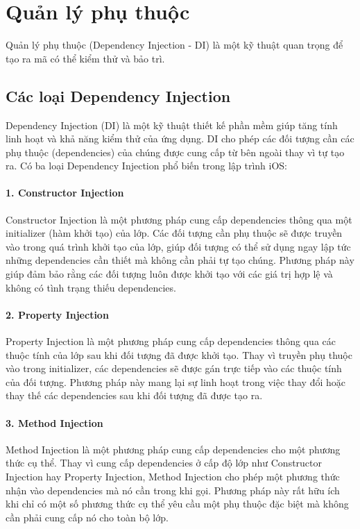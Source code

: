 \section{Quản lý phụ thuộc}
Quản lý phụ thuộc (Dependency Injection - DI) là một kỹ thuật quan trọng để tạo ra mã có thể kiểm thử và bảo trì.

\subsection{Các loại Dependency Injection}

Dependency Injection (DI) là một kỹ thuật thiết kế phần mềm giúp tăng tính linh hoạt và khả năng kiểm thử của ứng dụng. DI cho phép các đối tượng cần các phụ thuộc (dependencies) của chúng được cung cấp từ bên ngoài thay vì tự tạo ra. Có ba loại Dependency Injection phổ biến trong lập trình iOS:

\paragraph*{1. Constructor Injection}
Constructor Injection là một phương pháp cung cấp dependencies thông qua một initializer (hàm khởi tạo) của lớp. Các đối tượng cần phụ thuộc sẽ được truyền vào trong quá trình khởi tạo của lớp, giúp đối tượng có thể sử dụng ngay lập tức những dependencies cần thiết mà không cần phải tự tạo chúng. Phương pháp này giúp đảm bảo rằng các đối tượng luôn được khởi tạo với các giá trị hợp lệ và không có tình trạng thiếu dependencies.

\paragraph*{2. Property Injection}
Property Injection là một phương pháp cung cấp dependencies thông qua các thuộc tính của lớp sau khi đối tượng đã được khởi tạo. Thay vì truyền phụ thuộc vào trong initializer, các dependencies sẽ được gán trực tiếp vào các thuộc tính của đối tượng. Phương pháp này mang lại sự linh hoạt trong việc thay đổi hoặc thay thế các dependencies sau khi đối tượng đã được tạo ra.

\paragraph*{3. Method Injection}
  Method Injection là một phương pháp cung cấp dependencies cho một phương thức cụ thể. Thay vì cung cấp dependencies ở cấp độ lớp như Constructor Injection hay Property Injection, Method Injection cho phép một phương thức nhận vào dependencies mà nó cần trong khi gọi. Phương pháp này rất hữu ích khi chỉ có một số phương thức cụ thể yêu cầu một phụ thuộc đặc biệt mà không cần phải cung cấp nó cho toàn bộ lớp.

